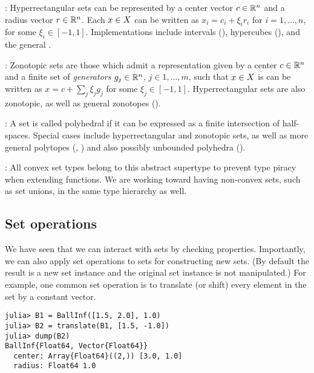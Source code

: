 : Hyperrectangular sets can be represented by a center vector $c \in \mathbb{R}^n$ and a radius vector $r \in \mathbb{R}^n$. Each $x \in X$ can be written as $x_i = c_i + \xi_i r_i$ for $i = 1,\ldots, n$, for some $\xi_i \in [-1, 1]$. Implementations include intervals (), hypercubes (), and the general .

\smallskip

: Zonotopic sets are those which admit a representation given by a center $c \in \mathbb{R}^n$ and a finite set of \emph{generators} $g_j \in \mathbb{R}^n$, $j \in 1, \ldots, m$, such that $x \in X$ is can be written as $x = c + \sum_j \xi_j g_j$ for some $\xi_j \in [-1, 1]$. Hyperrectangular sets are also zonotopic, as well as general zonotopes ().

\smallskip

: A set is called polyhedral if it can be expressed as a finite intersection of half-spaces. Special cases include hyperrectangular and zonotopic sets, as well as more general polytopes (, ) and also possibly unbounded polyhedra ().

\smallskip

: All convex set types belong to this abstract supertype to prevent type piracy when extending  functions.
We are working toward having non-convex sets, such as set unions, in the same type hierarchy as well.


\subsection{Set operations}

We have seen that we can interact with sets by checking properties.
Importantly, we can also apply set operations to sets for constructing new sets.
(By default the result is a new set instance and the original set instance is not manipulated.)
For example, one common set operation is to translate (or shift) every element in the set by a constant vector.

\begin{minipage}{\linewidth}
\vspace{-\abovedisplayskip}
\begin{lstlisting}
julia> B1 = BallInf([1.5, 2.0], 1.0)
julia> B2 = translate(B1, [1.5, -1.0])
julia> dump(B2)
BallInf{Float64, Vector{Float64}}
  center: Array{Float64}((2,)) [3.0, 1.0]
  radius: Float64 1.0
\end{lstlisting}
\end{minipage}

